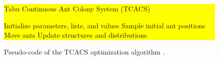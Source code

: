 \documentclass[3p]{elsarticle}
\begin{document}
\begin{figure}[H]
    \colorbox{yellow}{ %
    \begin{minipage}{\linewidth} %
        \begin{algorithm}[H]
            \caption{Tabu Continuous Ant Colony System (TCACS)}
            \begin{algorithmic}[1]
                \State Initialize parameters, lists, and values
                        \State Sample initial ant positions
                    \Else
                        \State Move ants
                    \EndIf
                    \State Update structures and distributions
                \EndWhile
                \EndProcedure
            \end{algorithmic}
            \label{alg:TCACS_code}
        \end{algorithm}
        \vspace{-0.7cm}
        \caption{Pseudo-code of the TCACS optimization algorithm \cite{article_TCACS}.}
        \label{fig:TCACS_code}
    \end{minipage}
    }
\end{figure}


\end{document}
